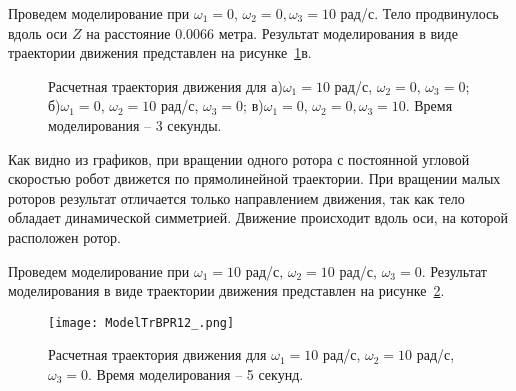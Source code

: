 Проведем моделирование при $\omega_1=0$, $\omega_2=0, \omega_3=10$ рад/с. Тело продвинулось вдоль оси $Z$ на расстояние 0.0066 метра. Результат моделирования в виде траектории движения представлен на рисунке~\ref{ModelTrBPR}в.

\begin{figure}[!ht]
	\begin{minipage}[h]{0.3\linewidth}
	\end{minipage}
	\hfill
	\begin{minipage}[h]{0.3\linewidth}
	\end{minipage}
	\hfill
	\begin{minipage}[h]{0.3\linewidth}
	\end{minipage}

	\begin{minipage}[h]{0.3\linewidth}
	\end{minipage}
	\hfill
	\begin{minipage}[h]{0.3\linewidth}
	\end{minipage}
	\hfill
	\begin{minipage}[h]{0.3\linewidth}
	\end{minipage}
	
	\caption{Расчетная траектория движения для а)$\omega_1=10$ рад/с, $\omega_2=0$, $\omega_3=0$; б)$\omega_1=0$, $\omega_2=10$ рад/с, $\omega_3=0$; в)$\omega_1=0$, $\omega_2=0, \omega_3=10$. Время моделирования -- 3 секунды.}
	\label{ModelTrBPR}
\end{figure}

Как видно из графиков, при вращении одного ротора с постоянной угловой скоростью робот движется по прямолинейной траектории. При вращении малых роторов результат отличается только направлением движения, так как тело обладает динамической симметрией. Движение происходит вдоль оси, на которой расположен ротор.

Проведем моделирование при $\omega_1=10$ рад/с, $\omega_2=10$ рад/с, $\omega_3=0$. Результат моделирования в виде траектории движения представлен на рисунке~\ref{ModelTrBPR12}.

\begin{figure}[h]
	\centering
	\texttt{[image: ModelTrBPR12\_.png]}%
	\caption{Расчетная траектория движения для $\omega_1=10$ рад/с, $\omega_2=10$ рад/с, $\omega_3=0$. Время моделирования -- 5 секунд.}
	\label{ModelTrBPR12}
\end{figure}

